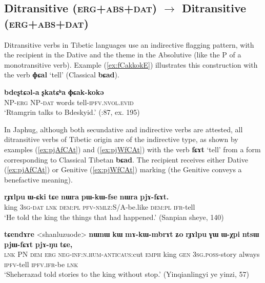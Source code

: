 \documentclass[oneside,a4paper,11pt]{article}
\newcommand{\ipa}[1]{{\phon\textbf{\mbox{#1}}}} %
\newcommand{\refb}[1]{(\ref{#1})}
\begin{document}
  \subsection{Ditransitive (\textsc{erg+abs+dat})  $\rightarrow$ Ditransitive (\textsc{erg+abs+dat})}
Ditransitive verbs in Tibetic languages use an indirective flagging pattern, with the recipient in the Dative and the theme in the Absolutive (like the P of a monotransitive verb). Example \refb{ex:fCakkokE} illustrates this construction with the verb \ipa{ɸɕal} `tell' (Classical \ipa{bɕad}).

\begin{exe}
\ex \label{ex:fCakkokE}
\gll \ipa{ʂtamɖʐən-ɣə}  \ipa{bdeʂtɕəl-a} \ipa{ʂkatɕʰa} \ipa{ɸɕak-kokə} \\
NP-\textsc{erg} NP-\textsc{dat} words tell-\textsc{ipfv.nvol.evid} \\
\glt `Rtamgrin talks to Bdeskyid.' (\citealt{haller04themchen}:87, ex. 195)
\end{exe}

In Japhug, although both secundative and indirective verbs are attested, all ditransitive verbs of Tibetic origin are of the indirective type, as shown by examples \refb{ex:pjAfCAt} and \refb{ex:pjWfCAt} with the verb \ipa{fɕɤt} `tell' from a form corresponding to Classical Tibetan \ipa{bɕad}. The recipient receives either Dative (\ref{ex:pjAfCAt}) or Genitive (\ref{ex:pjWfCAt}) marking (the Genitive conveys a benefactive meaning).

\begin{exe}
\ex \label{ex:pjAfCAt}
\gll
  \ipa{rɟɤlpu} 	\ipa{ɯ-ɕki} 	\ipa{tɕe} 	\ipa{nɯra} 	\ipa{pɯ-kɯ-fse} 	\ipa{nɯra} 	\ipa{pjɤ-fɕɤt.} \\
  king \textsc{3sg-dat} \textsc{lnk} \textsc{dem:pl} \textsc{pfv-nmlz}:S/A-be.like  \textsc{dem:pl} \textsc{ifr}-tell \\
  \glt `He told the king the things that had happened.' (Sanpian sheye, 140)
\end{exe}

\begin{exe}
\ex \label{ex:pjWfCAt}
\gll
  \ipa{tɕendɤre} 	<shanluzuode> 	\ipa{nɯnɯ} 	\ipa{kɯ} 	\ipa{mɤ-kɯ-mbrɤt} 	\ipa{ʑo} 	\ipa{rɟɤlpu} 	\ipa{ɣɯ} 	\ipa{ɯ-χpi} 	\ipa{ntsɯ} 	\ipa{pjɯ-fɕɤt} 	\ipa{pjɤ-ŋu} 	\ipa{tɕe,} \\
  \textsc{lnk} PN \textsc{dem} \textsc{erg} \textsc{neg-inf:n.hum}-\textsc{anticaus}:cut \textsc{emph} king \textsc{gen} \textsc{3sg.poss}-story always \textsc{ipfv}-tell \textsc{ipfv.ifr}-be \textsc{lnk} \\
\glt `Sheherazad told stories to the king without stop.' (Yinqianlingyi ye yinzi, 57)
\end{exe}
\end{document}
